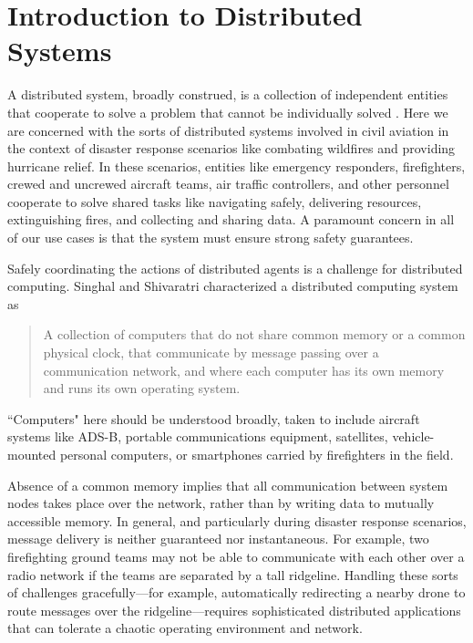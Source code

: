 \section{Introduction to Distributed Systems}

A distributed system, broadly construed, is a collection of
independent entities that cooperate to solve a problem that cannot be
individually solved \cite{kshemkalyani_singhal_2008}. Here we are
concerned with the sorts of distributed systems involved in civil
aviation in the context of disaster response scenarios like combating
wildfires and providing hurricane relief. In these scenarios, entities
like emergency responders, firefighters, crewed and uncrewed aircraft
teams, air traffic controllers, and other personnel cooperate to solve
shared tasks like navigating safely, delivering resources,
extinguishing fires, and collecting and sharing data. A paramount
concern in all of our use cases is that the system must ensure strong
safety guarantees.

Safely coordinating the actions of distributed agents is a challenge
for distributed computing. Singhal and Shivaratri
\cite{10.5555/562065} characterized a distributed computing system as
\begin{quotation}
  A collection of computers that do not share common memory or a
  common physical clock, that communicate by message passing over a
  communication network, and where each computer has its own memory
  and runs its own operating system.
\end{quotation}
``Computers" here should be understood broadly, taken to include
aircraft systems like ADS-B, portable communications equipment,
satellites, vehicle-mounted personal computers, or smartphones carried
by firefighters in the field.

Absence of a common memory implies that all communication between
system nodes takes place over the network, rather than by writing data
to mutually accessible memory. In general, and particularly during
disaster response scenarios, message delivery is neither guaranteed
nor instantaneous. For example, two firefighting ground teams may not
be able to communicate with each other over a radio network if the
teams are separated by a tall ridgeline. Handling these sorts of
challenges gracefully---for example, automatically redirecting a
nearby drone to route messages over the ridgeline---requires
sophisticated distributed applications that can tolerate a chaotic
operating environment and network.

